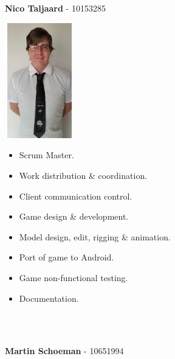\documentclass[letterpaper]{article}
\begin{document}
		\vspace{0.2in}
	\section*{\colorbox{black}{}} 
		\vspace{0.1in}
		
		\begin{Large} 
			\textbf{Nico Taljaard} - 10153285 \\
		\end{Large}
		
		\begin{minipage}[l]{0.23\textwidth}
			\begin{flushleft}
				\includegraphics[width=30mm,height=50mm]{Members/Nico.jpg}
			\end{flushleft}
		\end{minipage}
		\begin{minipage}[r]{0.75\textwidth}
			\begin{itemize}
				\item Scrum Master.
				\item Work distribution \& coordination.
				\item Client communication control.
				\item Game design \& development.
				\item Model design, edit, rigging \& animation.
				\item Port of game to Android.
				\item Game non-functional testing.
				\item Documentation.
			\end{itemize}
		\end{minipage} \\ \\
		
		\begin{flushleft}
			\begin{Large}
				\textbf{Martin Schoeman} - 10651994 \\
			\end{Large}
		\end{flushleft}
		
\end{document}
